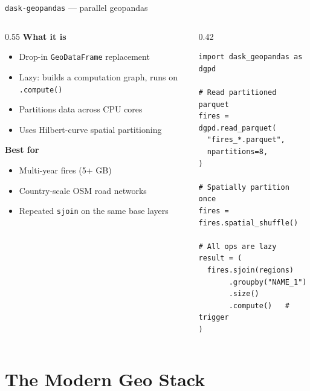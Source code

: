 \documentclass[10pt,aspectratio=169]{beamer}
\begin{document}
\begin{frame}[fragile]{\texttt{dask-geopandas} — parallel geopandas}
  \begin{columns}[T]
    \begin{column}{0.55\textwidth}
      \textbf{What it is}
      \begin{itemize}\itemsep2pt
        \item Drop-in \texttt{GeoDataFrame} replacement
        \item Lazy: builds a computation graph, runs on \texttt{.compute()}
        \item Partitions data across CPU cores
        \item Uses Hilbert-curve spatial partitioning
      \end{itemize}
      \vspace{0.4em}
      \textbf{Best for}
      \begin{itemize}\itemsep2pt
        \item Multi-year fires (5+ GB)
        \item Country-scale OSM road networks
        \item Repeated \texttt{sjoin} on the same base layers
      \end{itemize}
    \end{column}
    \begin{column}{0.42\textwidth}
\begin{lstlisting}[style=py]
import dask_geopandas as dgpd

# Read partitioned parquet
fires = dgpd.read_parquet(
  "fires_*.parquet",
  npartitions=8,
)

# Spatially partition once
fires = fires.spatial_shuffle()

# All ops are lazy
result = (
  fires.sjoin(regions)
       .groupby("NAME_1")
       .size()
       .compute()   # trigger
)
\end{lstlisting}
    \end{column}
  \end{columns}
\end{frame}

\section{The Modern Geo Stack}
\end{document}
